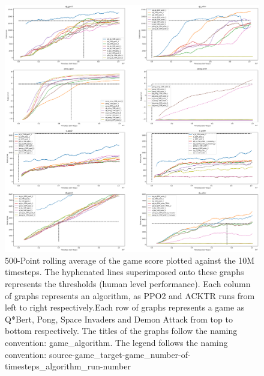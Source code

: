 \begin{figure}
	\includegraphics[width=\textwidth]{fig7.png} 
	\caption{500-Point rolling average of the game score plotted against the 10M timesteps. The hyphenated lines superimposed onto these graphs represents the thresholds (human level performance). Each column of graphs represents an algorithm, as PPO2 and ACKTR runs from left to right respectively.Each row of graphs represents a game as Q*Bert, Pong, Space Invaders and Demon Attack from top to bottom respectively. The titles of the graphs follow the naming convention: game\_algorithm. The legend follows the naming convention: source-game\_target-game\_number-of-timesteps\_algorithm\_run-number}
\end{figure}
 
